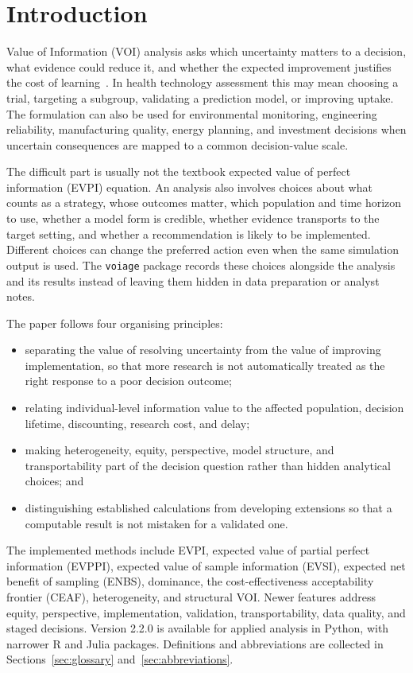 \section{Introduction}

Value of Information (VOI) analysis asks which uncertainty matters to a
decision, what evidence could reduce it, and whether the expected improvement
justifies the cost of
learning~\cite{claxton1999irrelevance,briggs2006decision}. In health technology
assessment this may mean
choosing a trial, targeting a subgroup, validating a prediction model, or
improving uptake. The formulation can also be used for environmental
monitoring, engineering reliability, manufacturing quality, energy planning,
and investment decisions when uncertain consequences are mapped to a common
decision-value scale.

The difficult part is usually not the textbook expected value of perfect
information (EVPI) equation. An analysis also involves choices about what
counts as a strategy, whose outcomes matter, which population and time horizon
to use, whether a model form is credible, whether evidence transports to the
target setting, and whether a recommendation is likely to be implemented.
Different choices can change
the preferred action even when the same simulation output is used. The
\texttt{voiage} package records these choices alongside the analysis and its
results instead of leaving them hidden in data preparation or analyst notes.

The paper follows four organising principles:
\begin{itemize}
  \item separating the value of resolving uncertainty from the value of
  improving implementation, so that more research is not automatically treated
  as the right response to a poor decision outcome;
  \item relating individual-level information value to the affected
  population, decision lifetime, discounting, research cost, and delay;
  \item making heterogeneity, equity, perspective, model structure, and
  transportability part of the decision question rather than hidden analytical
  choices; and
  \item distinguishing established calculations from developing extensions so
  that a computable result is not mistaken for a validated one.
\end{itemize}

The implemented methods include EVPI, expected value of partial perfect
information (EVPPI), expected value of sample information (EVSI), expected net
benefit of sampling (ENBS), dominance, the cost-effectiveness acceptability
frontier (CEAF), heterogeneity, and structural VOI\@. Newer features address
equity, perspective, implementation, validation, transportability, data
quality, and staged decisions. Version 2.2.0 is available for applied analysis
in Python, with narrower R and Julia packages. Definitions
and abbreviations are collected in Sections~\ref{sec:glossary}
and~\ref{sec:abbreviations}.
